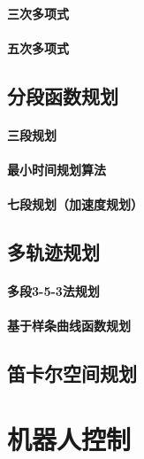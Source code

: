 \documentclass[
12pt, %
a4paper, 
oneside, %
headinclude,footinclude, %
]{scrartcl}
\begin{document}
\paragraph{三次多项式}

\paragraph{五次多项式}

\subsection[分段函数规划]{分段函数规划}
\paragraph{三段规划}

\paragraph{最小时间规划算法}

\paragraph{七段规划（加速度规划）}

\subsection[多轨迹规划]{多轨迹规划}
\paragraph{多段3-5-3法规划}

\paragraph{基于样条曲线函数规划}

\subsection[笛卡尔空间规划]{笛卡尔空间规划}

\section{机器人控制}
\end{document}
